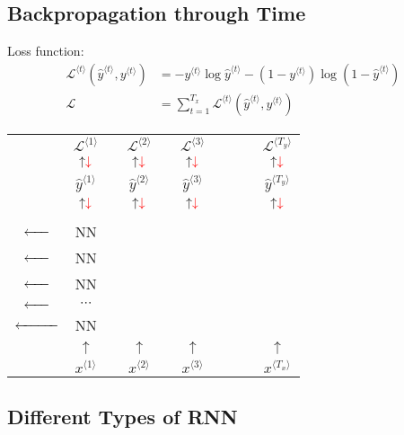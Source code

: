 \subsection{Backpropagation through Time}
Loss function:
\begin{align*}
  \mathcal{L}^{\langle t\rangle}\left(\hat{y}^{\langle t\rangle}, y^{\langle t\rangle}\right)&=-y^{\langle t\rangle}\log\hat{y}^{\langle t\rangle}-\left(1-y^{\langle t\rangle}\right)\log\left(1-\hat{y}^{\langle t\rangle}\right)\\
  \mathcal{L}&=\displaystyle\sum_{t=1}^{T_x}\mathcal{L}^{\langle t\rangle}\left(\hat{y}^{\langle t\rangle}, y^{\langle t\rangle}\right)
\end{align*}
\begin{center}
  \begin{tabular}{cccccccccc}
    & $\mathcal{L}^{\langle 1\rangle}$ & & $\mathcal{L}^{\langle 2\rangle}$ & & $\mathcal{L}^{\langle 3\rangle}$ & & & & $\mathcal{L}^{\langle T_y\rangle}$\\
    & $\uparrow\color{red}\downarrow$ & & $\uparrow\color{red}\downarrow$ & & $\uparrow\color{red}\downarrow$ & & & & $\uparrow\color{red}\downarrow$\\ 
    & $\hat{y}^{\langle 1\rangle}$ & & $\hat{y}^{\langle 2\rangle}$ & & $\hat{y}^{\langle 3\rangle}$ & & & & $\hat{y}^{\langle T_y\rangle}$\\
    & $\uparrow\color{red}\downarrow$ & & $\uparrow\color{red}\downarrow$ & & $\uparrow\color{red}\downarrow$ & & & & $\uparrow\color{red}\downarrow$\\ 
    \makecell{$\xrightarrow{a^{\langle 0\rangle}}$\\\color{red}$\xleftarrow{\hphantom{a^{\langle 0\rangle}}}$}& NN & \makecell{$\xrightarrow{a^{\langle 1\rangle}}$\\\color{red}$\xleftarrow{\hphantom{a^{\langle 0\rangle}}}$} & NN & \makecell{$\xrightarrow{a^{\langle 2\rangle}}$\\\color{red}$\xleftarrow{\hphantom{a^{\langle 2\rangle}}}$} & NN & \makecell{$\xrightarrow{a^{\langle 3\rangle}}$\\\color{red}$\xleftarrow{\hphantom{a^{\langle 0\rangle}}}$} & $\cdots$ & \makecell{$\xrightarrow{a^{\langle T_x-1\rangle}}$\\\color{red}$\xleftarrow{\hphantom{a^{\langle T_x-1\rangle}}}$} & NN \\ 
    & $\uparrow$ & & $\uparrow$ & & $\uparrow$ & & & & $\uparrow$\\ 
    & $x^{\langle 1\rangle}$ & & $x^{\langle 2\rangle}$ & & $x^{\langle 3\rangle}$ & & & & $x^{\langle T_x\rangle}$\\
  \end{tabular}
\end{center}
\subsection{Different Types of RNN}
\ifx\PREAMBLE\undefined

\fi